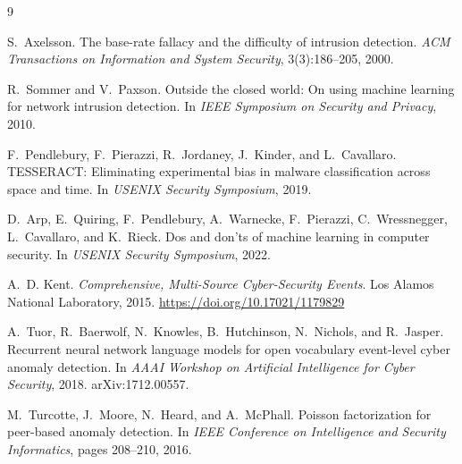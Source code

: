 \documentclass[11pt,a4paper]{article}
\begin{document}
\begin{thebibliography}{9}

S.~Axelsson.
\newblock The base-rate fallacy and the difficulty of intrusion detection.
\newblock \emph{ACM Transactions on Information and System Security}, 3(3):186--205, 2000.

R.~Sommer and V.~Paxson.
\newblock Outside the closed world: On using machine learning for network intrusion detection.
\newblock In \emph{IEEE Symposium on Security and Privacy}, 2010.

F.~Pendlebury, F.~Pierazzi, R.~Jordaney, J.~Kinder, and L.~Cavallaro.
\newblock TESSERACT: Eliminating experimental bias in malware classification across space and time.
\newblock In \emph{USENIX Security Symposium}, 2019.

D.~Arp, E.~Quiring, F.~Pendlebury, A.~Warnecke, F.~Pierazzi, C.~Wressnegger, L.~Cavallaro, and K.~Rieck.
\newblock Dos and don'ts of machine learning in computer security.
\newblock In \emph{USENIX Security Symposium}, 2022.

A.~D. Kent.
\newblock \emph{Comprehensive, Multi-Source Cyber-Security Events}.
\newblock Los Alamos National Laboratory, 2015.
\newblock \url{https://doi.org/10.17021/1179829}

A.~Tuor, R.~Baerwolf, N.~Knowles, B.~Hutchinson, N.~Nichols, and R.~Jasper.
\newblock Recurrent neural network language models for open vocabulary event-level cyber anomaly detection.
\newblock In \emph{AAAI Workshop on Artificial Intelligence for Cyber Security}, 2018.
\newblock arXiv:1712.00557.

M.~Turcotte, J.~Moore, N.~Heard, and A.~McPhall.
\newblock Poisson factorization for peer-based anomaly detection.
\newblock In \emph{IEEE Conference on Intelligence and Security Informatics}, pages 208--210, 2016.

\end{thebibliography}
\end{document}

